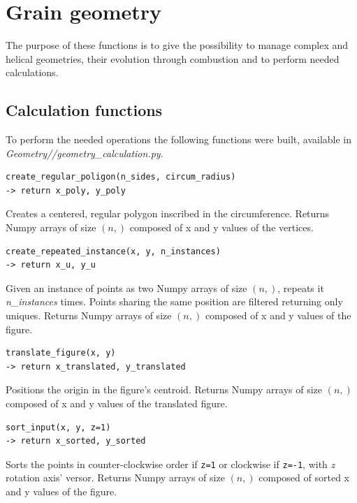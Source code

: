\newpage
\chapter{Grain geometry}
The purpose of these functions is to give the possibility to manage complex and helical geometries, their evolution through combustion and to perform needed calculations.

\section{Calculation functions}
To perform the needed operations the following functions were built, available in \textit{Geometry//geometry\_calculation.py}.

\begin{verbatim}
create_regular_poligon(n_sides, circum_radius)
-> return x_poly, y_poly
\end{verbatim}

\hspace*{2em} Creates a centered, regular polygon inscribed in the circumference. Returns Numpy \cite{harris2020array} arrays of size $(n,)$ composed of x and y values of the vertices.

\begin{verbatim}
create_repeated_instance(x, y, n_instances)
-> return x_u, y_u
\end{verbatim}
\hspace*{2em} Given an instance of points as two Numpy arrays of size $(n,)$, repeats it \textit{n\_instances} times. Points sharing the same position are filtered returning only uniques. Returns Numpy arrays of size $(n,)$ composed of x and y values of the figure.

\begin{verbatim}
translate_figure(x, y)
-> return x_translated, y_translated
\end{verbatim}
\hspace*{2em} Positions the origin in the figure's centroid. Returns Numpy arrays of size $(n,)$ composed of x and y values of the translated figure.

\begin{verbatim}
sort_input(x, y, z=1)
-> return x_sorted, y_sorted
\end{verbatim}
\hspace*{2em} Sorts the points in counter-clockwise order if \verb|z=1| or clockwise if \verb|z=-1|, with \textit{z} rotation axis' versor. Returns Numpy arrays of size $(n,)$ composed of sorted x and y values of the figure.

